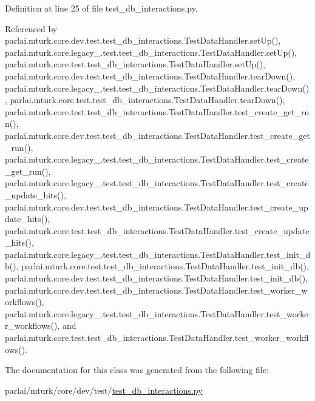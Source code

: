 Definition at line 25 of file test\+\_\+db\+\_\+interactions.\+py.



Referenced by parlai.\+mturk.\+core.\+dev.\+test.\+test\+\_\+db\+\_\+interactions.\+Test\+Data\+Handler.\+set\+Up(), parlai.\+mturk.\+core.\+legacy\+\_.\+test.\+test\+\_\+db\+\_\+interactions.\+Test\+Data\+Handler.\+set\+Up(), parlai.\+mturk.\+core.\+test.\+test\+\_\+db\+\_\+interactions.\+Test\+Data\+Handler.\+set\+Up(), parlai.\+mturk.\+core.\+dev.\+test.\+test\+\_\+db\+\_\+interactions.\+Test\+Data\+Handler.\+tear\+Down(), parlai.\+mturk.\+core.\+legacy\+\_.\+test.\+test\+\_\+db\+\_\+interactions.\+Test\+Data\+Handler.\+tear\+Down(), parlai.\+mturk.\+core.\+test.\+test\+\_\+db\+\_\+interactions.\+Test\+Data\+Handler.\+tear\+Down(), parlai.\+mturk.\+core.\+test.\+test\+\_\+db\+\_\+interactions.\+Test\+Data\+Handler.\+test\+\_\+create\+\_\+get\+\_\+run(), parlai.\+mturk.\+core.\+dev.\+test.\+test\+\_\+db\+\_\+interactions.\+Test\+Data\+Handler.\+test\+\_\+create\+\_\+get\+\_\+run(), parlai.\+mturk.\+core.\+legacy\+\_.\+test.\+test\+\_\+db\+\_\+interactions.\+Test\+Data\+Handler.\+test\+\_\+create\+\_\+get\+\_\+run(), parlai.\+mturk.\+core.\+legacy\+\_.\+test.\+test\+\_\+db\+\_\+interactions.\+Test\+Data\+Handler.\+test\+\_\+create\+\_\+update\+\_\+hits(), parlai.\+mturk.\+core.\+dev.\+test.\+test\+\_\+db\+\_\+interactions.\+Test\+Data\+Handler.\+test\+\_\+create\+\_\+update\+\_\+hits(), parlai.\+mturk.\+core.\+test.\+test\+\_\+db\+\_\+interactions.\+Test\+Data\+Handler.\+test\+\_\+create\+\_\+update\+\_\+hits(), parlai.\+mturk.\+core.\+legacy\+\_.\+test.\+test\+\_\+db\+\_\+interactions.\+Test\+Data\+Handler.\+test\+\_\+init\+\_\+db(), parlai.\+mturk.\+core.\+test.\+test\+\_\+db\+\_\+interactions.\+Test\+Data\+Handler.\+test\+\_\+init\+\_\+db(), parlai.\+mturk.\+core.\+dev.\+test.\+test\+\_\+db\+\_\+interactions.\+Test\+Data\+Handler.\+test\+\_\+init\+\_\+db(), parlai.\+mturk.\+core.\+dev.\+test.\+test\+\_\+db\+\_\+interactions.\+Test\+Data\+Handler.\+test\+\_\+worker\+\_\+workflows(), parlai.\+mturk.\+core.\+legacy\+\_.\+test.\+test\+\_\+db\+\_\+interactions.\+Test\+Data\+Handler.\+test\+\_\+worker\+\_\+workflows(), and parlai.\+mturk.\+core.\+test.\+test\+\_\+db\+\_\+interactions.\+Test\+Data\+Handler.\+test\+\_\+worker\+\_\+workflows().



The documentation for this class was generated from the following file\+:\begin{DoxyCompactItemize}
\item 
parlai/mturk/core/dev/test/\hyperlink{dev_2test_2test__db__interactions_8py}{test\+\_\+db\+\_\+interactions.\+py}\end{DoxyCompactItemize}
